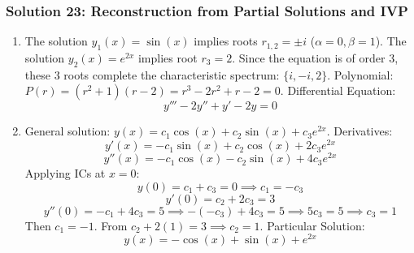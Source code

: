 \documentclass[11pt,letterpaper]{article}
\begin{document}
\subsubsection*{Solution 23: Reconstruction from Partial Solutions and IVP}
\begin{enumerate}[label=(\alph*)]
    \item The solution $y_1(x) = \sin(x)$ implies roots $r_{1,2} = \pm i$ ($\alpha = 0, \beta = 1$).
    The solution $y_2(x) = e^{2x}$ implies root $r_3 = 2$.
    Since the equation is of order 3, these 3 roots complete the characteristic spectrum: $\{i, -i, 2\}$.
    Polynomial: $P(r) = (r^2 + 1)(r - 2) = r^3 - 2r^2 + r - 2 = 0$.
    Differential Equation:
    \[ y''' - 2y'' + y' - 2y = 0 \]
    \item General solution: $y(x) = c_1 \cos(x) + c_2 \sin(x) + c_3 e^{2x}$.
    Derivatives:
    \[ y'(x) = -c_1 \sin(x) + c_2 \cos(x) + 2c_3 e^{2x} \]
    \[ y''(x) = -c_1 \cos(x) - c_2 \sin(x) + 4c_3 e^{2x} \]
    Applying ICs at $x=0$:
    \[ y(0) = c_1 + c_3 = 0 \implies c_1 = -c_3 \]
    \[ y'(0) = c_2 + 2c_3 = 3 \]
    \[ y''(0) = -c_1 + 4c_3 = 5 \implies -(-c_3) + 4c_3 = 5 \implies 5c_3 = 5 \implies c_3 = 1 \]
    Then $c_1 = -1$.
    From $c_2 + 2(1) = 3 \implies c_2 = 1$.
    Particular Solution:
    \[ y(x) = -\cos(x) + \sin(x) + e^{2x} \]
\end{enumerate}
\end{document}
